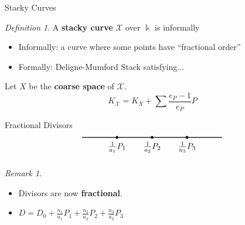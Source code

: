 \documentclass{beamer}
\theoremstyle{remark}
\newtheorem{rem}[thm]{Remark}
\newtheorem{defn}[thm]{Definition}
\newcommand\BQ{{\mathbb Q}}
\newcommand \sx{{\mathscr X}}
\DeclareMathOperator\di{Div}
\newcommand\Bk{{\Bbbk}}
\begin{document}
\begin{frame}{Stacky Curves}
\begin{defn}
A \textbf{stacky curve} $\sx$ over $\Bk$
is informally
	\begin{itemize}
		\item Informally: a curve where some points have ``fractional order''
		\item Formally: Deligne-Mumford Stack satisfying...
	\end{itemize}
\end{defn}

\begin{fact}
Let $X$ be the {\bf coarse space} of $\sx$.
\[
	K_{\sx} = K_X + \sum \frac{e_P-1}{e_P} P
\]
\end{fact}
\end{frame}


\begin{frame}{Fractional Divisors}
\begin{equation} \label{pic:M-curve} \notag
  \begin{tikzpicture}
    \draw[thick] (-3,0) -- (3,0);
		
		
		\filldraw[draw=black,fill=black] (-1.5,0) node [below=2pt]{$\frac{1}{a_1}P_1$} circle (1.5pt);
		\filldraw[draw=black,fill=black] (0,0) node [below=2pt] {$\frac{1}{a_2}P_2$} circle (1.5pt);
		\filldraw[draw=black,fill=black] (1.5,0) node [below=2pt] {$\frac{1}{a_3}P_3$} circle (1.5pt);
		
  \end{tikzpicture}
\end{equation}

\begin{rem}
  \begin{itemize}
  \item Divisors are now \textbf{fractional}.
  \item $D = D_0 + \frac{n_{1}}{a_1}P_1 + \frac{n_{2}}{a_2}P_2 + \frac{n_{3}}{a_3}P_{3}$
  \end{itemize}
\end{rem}

\end{frame}
\end{document}
